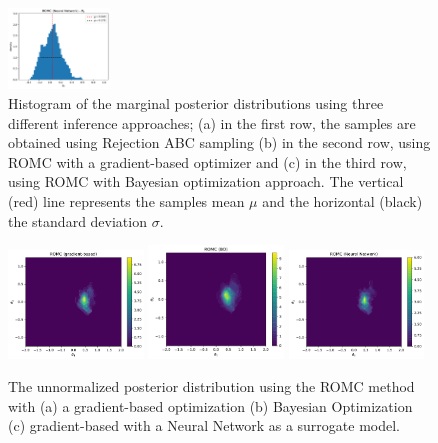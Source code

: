 \documentclass[article, shortnames]{jss}
\begin{document}
\begin{figure}[ht]
\begin{center}
    \includegraphics[width=0.24\textwidth]{./Figures/chapter4/mae2_hist_t2_romc_nn.pdf}
    \end{center}
    \caption[MA2 example, evaluation of the marginal
    distributions.]{Histogram of the marginal posterior distributions
      using three different inference approaches; (a) in the first
      row, the samples are obtained using Rejection ABC sampling (b)
      in the second row, using ROMC with a gradient-based optimizer
      and (c) in the third row, using ROMC with Bayesian optimization
      approach. The vertical (red) line represents the samples mean
      \(\mu\) and the horizontal (black) the standard deviation
      \(\sigma\).}
  \label{fig:ma2_3}
\end{figure}

\begin{figure}[ht]
  \begin{center}
    \includegraphics[width=0.32\textwidth]{./Figures/chapter4/mae2_romc_posterior.pdf}
    \includegraphics[width=0.32\textwidth]{./Figures/chapter4/mae2_romc_posterior_bo.pdf}
    \includegraphics[width=0.32\textwidth]{./Figures/chapter4/mae2_romc_posterior_nn.pdf}
    \end{center}
    \caption[MA2 example, posterior distribution.]{The unnormalized posterior distribution using the ROMC method with (a) a gradient-based optimization (b) Bayesian Optimization (c) gradient-based with a Neural Network as a surrogate model.}
  \label{fig:ma2_4}
\end{figure}
\end{document}
